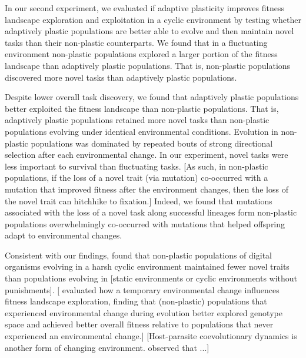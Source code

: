 In our second experiment, we evaluated if adaptive plasticity improves fitness landscape exploration and exploitation in a cyclic environment by testing whether adaptively plastic populations are better able to evolve and then maintain novel tasks than their non-plastic counterparts.
We found that in a fluctuating environment non-plastic populations explored a larger portion of the fitness landscape than adaptively plastic populations.
That is, non-plastic populations discovered more novel tasks than adaptively plastic populations.

Despite lower overall task discovery, we found that adaptively plastic populations better exploited the fitness landscape than non-plastic populations.
That is, adaptively plastic populations retained more novel tasks than non-plastic populations evolving under identical environmental conditions.
Evolution in non-plastic populations was dominated by repeated bouts of strong directional selection after each environmental change. 
In our experiment, novel tasks were less important to survival than fluctuating tasks.
[As such, in non-plastic populations, if the loss of a novel trait (via mutation) co-occurred with a mutation that improved fitness after the environment changes, then the loss of the novel trait can hitchhike to fixation.] %
Indeed, we found that mutations associated with the loss of a novel task along successful lineages form non-plastic populations overwhelmingly co-occurred with mutations that helped offspring adapt to environmental changes.

Consistent with our findings, \cite{canino-koning_fluctuating_2019} found that non-plastic populations of digital organisms evolving in a harsh cyclic environment maintained fewer novel traits than populations evolving in [static environments or cyclic environments without punishments].
[\cite{nahum_improved_2017} evaluated how a temporary environmental change influences fitness landscape exploration, finding that (non-plastic) populations that experienced environmental change during evolution better explored genotype space and achieved better overall fitness relative to populations that never experienced an environmental change.]
[Host-parasite coevolutionary dynamics is another form of changing environment. \cite{zaman_coevolution_2014} observed that ...]

